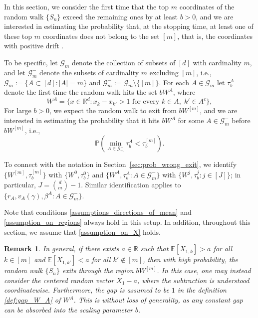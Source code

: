\documentclass[aap,preprint]{imsart}
\newcommand{\Mstar}{[m]}
\newcommand{\Pro}{{\mathbb{P}}}
\newcommand{\bR}{{\mathbb{R}}}
\theoremstyle{plain}
\newtheorem{remark}{Remark}[section]
\theoremstyle{definition}
\begin{document}
In this section, we consider the first time that the top $m$ coordinates of the random walk $\{S_n\}$ exceed the remaining ones by at least $b > 0$, and we are interested in estimating the probability that, at the stopping time, at least one of these top $m$ coordinates does not belong to the set $[m]$, that is, the coordinates with positive drift \citep{song2017asymptotically}.



To be specific, let $\mathcal{G}_m$ denote the collection of subsets of $[d]$ with cardinality $m$, and let $\mathcal{G}_m^{-}$ denote the subsets of cardinality $m$ excluding $\Mstar$, i.e., 
$\mathcal{G}_m  :=  \{A \subset [d]: |A| = m\}$ and  $\mathcal{G}_m^{-}  :=  \mathcal{G}_m \setminus \{\Mstar\}$. For each $A  \in \mathcal{G}_m$ 
 let $\tau_b^A$ denote the first time the random walk hits  the set $b W^{A}$, where   
\begin{equation}
    \label{def:gap_W_A}
W^{A} = \{x \in \bR^d: x_{k} - x_{k'} > 1 \text{ for every } k \in A,\; k' \in A^c\},
\end{equation}
For large $b > 0$, we expect the random walk to exit from $b W^{\Mstar}$, and we are interested in estimating the probability that it hits   $b W^{A}$ for some 
$ A \in \mathcal{G}_m^{-}$ before  $b W^{\Mstar}$, i.e.,  
$$\Pro\left(  \min_{A \in \mathcal{G}_m^{-}} \tau_b^A < \tau_b^{[m]} \right).$$

  
  To connect with the notation in Section~\ref{sec:prob_wrong_exit}, 
  we identify $\{W^{\Mstar}, \tau_b^{\Mstar}\}$ with $\{W^{0}, \tau_b^{0}\}$ and $\{W^{A}, \tau_b^{A}: A \in \mathcal{G}_m^{-}\}$ with $\{W^{j}, \tau_b^{j}: j \in [J]\}$; in particular, $J = \binom{d}{m}-1$. Similar identification applies to $\{r_A, v_A(\gamma), \beta^{A}: A \in \mathcal{G}_m^{-}\}$. 

Note that conditions \eqref{assumptions_directions_of_mean} and \eqref{assumption_on_regions}  always hold in this setup. In addition, throughout this section, we assume that \eqref{assumption_on_X} holds.

\begin{remark}
In general, if there exists $a \in \mathbb{R}$ such that $\mathbb{E}[X_{1,k}] > a$ for all $k \in \Mstar$ and $\mathbb{E}[X_{1,k'}] < a$ for all $k' \not\in \Mstar$, then with high probability, the random walk $\{S_n\}$ exits through the region $b W^{\Mstar}$. In this case, one may instead consider the centered random vector $X_1 - a$, where the subtraction is understood coordinatewise.
Furthermore, the gap is assumed to be $1$ in the definition \eqref{def:gap_W_A} of $W^A$. This is without loss of generality, as any constant gap can be absorbed into the scaling parameter $b$.
\end{remark}
\end{document}
